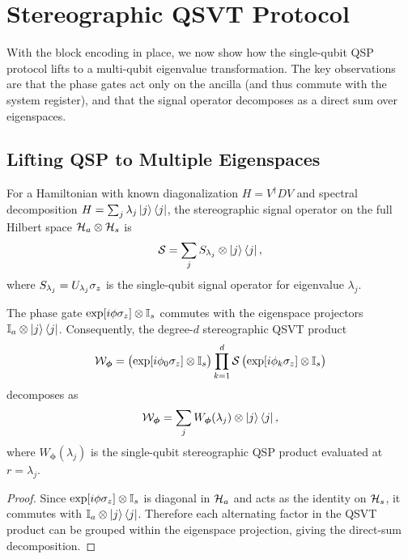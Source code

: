 \section{Stereographic QSVT Protocol}
\label{sec:qsvt}

With the block encoding in place, we now show how the
single-qubit QSP protocol lifts to a multi-qubit eigenvalue
transformation.  The key observations are that the phase gates
act only on the ancilla (and thus commute with the system
register), and that the signal operator decomposes as a direct
sum over eigenspaces.

\subsection{Lifting QSP to Multiple Eigenspaces}
\label{subsec:lifting}

For a Hamiltonian with known diagonalization
$H = V^\dagger D V$ and spectral decomposition
$H = \sum_j \lambda_j \ket{j}\bra{j}$, the stereographic
signal operator on the full Hilbert space
$\mathcal{H}_a \otimes \mathcal{H}_s$ is
\begin{equation}
	\mathcal{S} = \sum_j S_{\lambda_j} \otimes \ket{j}\bra{j},
	\label{eq:multi-signal}
\end{equation}
where $S_{\lambda_j} = U_{\lambda_j}\sigma_z$ is the
single-qubit signal operator for eigenvalue $\lambda_j$.

\begin{proposition}
	\label{prop:direct-sum}
	The phase gate
	$\exp[i\phi\sigma_z] \otimes \mathbb{I}_s$ commutes with the
	eigenspace projectors $\mathbb{I}_a \otimes \ket{j}\bra{j}$.
	Consequently, the degree-$d$ stereographic QSVT product
	\begin{equation}
		\mathcal{W}_{\bm{\phi}}
		= \bigl(\exp[i\phi_0\sigma_z] \otimes \mathbb{I}_s\bigr)
		\prod_{k=1}^{d}
		\mathcal{S}\,
		\bigl(\exp[i\phi_k\sigma_z] \otimes \mathbb{I}_s\bigr)
		\label{eq:qsvt-product}
	\end{equation}
	decomposes as
	\begin{equation}
		\mathcal{W}_{\bm{\phi}}
		= \sum_j W_{\bm{\phi}}(\lambda_j) \otimes
		\ket{j}\bra{j},
		\label{eq:qsvt-decomposition}
	\end{equation}
	where $W_{\bm{\phi}}(\lambda_j)$ is the single-qubit
	stereographic QSP product evaluated at $r = \lambda_j$.
\end{proposition}

\begin{proof}
	Since $\exp[i\phi\sigma_z] \otimes \mathbb{I}_s$ is diagonal in
	$\mathcal{H}_a$ and acts as the identity on $\mathcal{H}_s$, it commutes
	with $\mathbb{I}_a \otimes \ket{j}\bra{j}$.  Therefore each
	alternating factor in the QSVT product can be grouped within
	the eigenspace projection, giving the direct-sum
	decomposition.
\end{proof}


